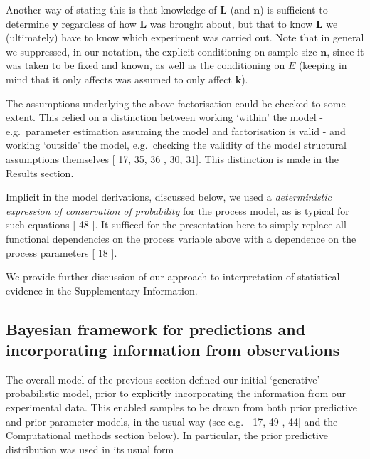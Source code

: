 \documentclass[10pt,letterpaper]{article}
\providecommand{\DIFaddtex}[1]{{\protect\color{blue} \sf #1}} %
\providecommand{\DIFdeltex}[1]{{\protect\color{red} \scriptsize #1}} %
\providecommand{\DIFaddbegin}{} %
\providecommand{\DIFaddend}{} %
\providecommand{\DIFdelbegin}{} %
\providecommand{\DIFdelend}{} %
\providecommand{\DIFadd}[1]{\texorpdfstring{\DIFaddtex{#1}}{#1}} %
\providecommand{\DIFdel}[1]{\texorpdfstring{\DIFdeltex{#1}}{}} %
\begin{document}
\DIFadd{Another way of stating this is that knowledge of \(\mathbf{L}\) (and
\(\mathbf{n}\)) is sufficient to determine \(\mathbf{y}\) regardless of
how \(\mathbf{L}\) was brought about, but that to know \(\mathbf{L}\) we
(ultimately) have to know which experiment was carried out. Note that in
general we }\DIFaddend suppressed, in our notation, the explicit conditioning on
sample size \(\mathbf{n}\), since it was taken to be fixed and known, as
well as the conditioning on \(E\) (keeping in mind that it \DIFdelbegin \DIFdel{only affects }\DIFdelend \DIFaddbegin \DIFadd{was assumed
to only affect }\DIFaddend \(\mathbf{k}\)).

The assumptions underlying the above factorisation could be checked to
some extent. This relied on a distinction between working `within' the
model - e.g.~parameter estimation assuming the model and factorisation
is valid - and working `outside' the model, e.g.~checking the validity
of the model structural assumptions themselves {[}\DIFdelbegin \DIFdel{17, 35, 36}\DIFdelend \DIFaddbegin \DIFadd{20, 30, 31}\DIFaddend {]}. This
distinction is made in the Results section.

Implicit in the model derivations, discussed below, we used a
\emph{deterministic expression of conservation of probability} for the
process model, as is typical for such equations {[}\DIFdelbegin \DIFdel{48}\DIFdelend \DIFaddbegin \DIFadd{43}\DIFaddend {]}. It sufficed
for the presentation here to simply replace all functional dependencies
on the process variable above with a dependence on the process
parameters {[}\DIFdelbegin \DIFdel{18}\DIFdelend \DIFaddbegin \DIFadd{21}\DIFaddend {]}.

\DIFaddbegin \DIFadd{We provide further discussion of our approach to interpretation of
statistical evidence in the Supplementary Information.
}

\DIFaddend \subsection{Bayesian framework for predictions and incorporating
information from
observations}\label{bayesian-framework-for-predictions-and-incorporating-information-from-observations}

The overall model of the previous section defined our initial
`generative' probabilistic model, prior to explicitly incorporating
\DIFdelbegin \DIFdel{the
}\DIFdelend information from our experimental data. This enabled samples to be drawn
from both prior predictive and prior parameter models, in the usual way
(see e.g. {[}\DIFdelbegin \DIFdel{17, 49}\DIFdelend \DIFaddbegin \DIFadd{20, 44}\DIFaddend {]} and the Computational methods section below). In
particular, the prior predictive distribution was used in its usual form
\end{document}
